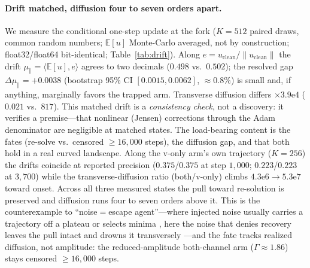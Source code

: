 \documentclass[10pt]{article}
\begin{document}
\paragraph{Drift matched, diffusion four to seven orders apart.}
We measure the conditional one-step update at the fork ($K{=}512$ paired draws,
common random numbers; $\mathbb{E}[u]$ Monte-Carlo averaged, not by construction;
float32/float64 bit-identical; Table~\ref{tab:drift}). Along
$e=u_{\mathrm{clean}}/\|u_{\mathrm{clean}}\|$ the drift
$\mu_\parallel=\langle\mathbb{E}[u],e\rangle$ agrees to two decimals
($0.498$ vs.\ $0.502$); the resolved gap $\Delta\mu_\parallel=+0.0038$
(bootstrap 95\% CI $[0.0015,0.0062]$, ${\approx}0.8\%$) is small and, if anything,
marginally favors the trapped arm. Transverse diffusion differs $\times3.9\mathrm{e}4$
($0.021$ vs.\ $817$). This matched drift is a \emph{consistency check}, not a
discovery: it verifies a premise---that nonlinear (Jensen) corrections through the
Adam denominator are negligible at matched states. The load-bearing content is the
fates (re-solve vs.\ censored ${\ge}16{,}000$ steps), the diffusion gap, and that
both hold in a real curved landscape. Along the v-only arm's own trajectory
($K{=}256$) the drifts coincide at reported precision ($0.375$/$0.375$ at step
$1{,}000$; $0.223$/$0.223$ at $3{,}700$) while the transverse-diffusion ratio
(both/v-only) climbs $4.3\mathrm{e}6\!\to\!5.3\mathrm{e}7$ toward onset. Across all
three measured states the pull toward re-solution is preserved and diffusion runs
four to seven orders above it. This is the counterexample to ``noise$=$escape
agent''---where injected noise usually carries a trajectory off a plateau
\citep{saddle,zhu} or selects minima \citep{wumae,ziyin,eoss,wenfisher}, here the
noise that denies recovery leaves the pull intact and drowns it transversely
\citep{stochcollapse}---and the fate tracks realized diffusion, not amplitude: the
reduced-amplitude both-channel arm ($\Gamma\approx1.86$) stays censored
${\ge}16{,}000$ steps.
\end{document}
